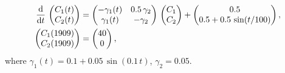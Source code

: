 \documentclass[draft]{agujournal2019}
\newcommand{\deriv}[1]{\frac{\mathrm{d}}{\mathrm{d}#1}}
\providecommand{\DIFaddend}{} %
\begin{document}
    \DIFaddend \begin{equation}\label{eqn:CS_two_dim_example}
        \begingroup\makeatletter\def\f@size{10}\check@mathfonts
        \begin{aligned}
            \deriv{t}\,\begin{pmatrix} C_1(t) \\ C_2(t) \end{pmatrix} &= 
            \begin{pmatrix} -\gamma_1(t) & 0.5\,\gamma_2 \\ \gamma_1(t) & -\gamma_2 \end{pmatrix} \,
            \begin{pmatrix} C_1 \\ C_2 \end{pmatrix} +  
            \begin{pmatrix} 0.5 \\ 0.5 + 0.5\,\sin(t/100) \end{pmatrix},\\
            \begin{pmatrix} C_1(1909) \\ C_2(1909) \end{pmatrix} &=
            \begin{pmatrix} 40 \\ 0 \end{pmatrix},
        \end{aligned}
        \endgroup
    \end{equation}
    where $\gamma_1(t)=0.1+0.05\,\sin(0.1\,t)$, $\gamma_2=0.05$.
\end{document}
